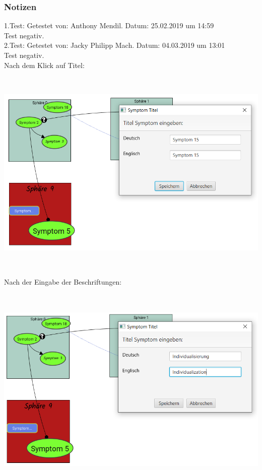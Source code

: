 \documentclass[enabledeprecatedfontcommands]{scrartcl}
\begin{document}
\subsubsection{Notizen}
1.Test: Getestet von: Anthony Mendil. Datum: 25.02.2019 um 14:59 \\
Test negativ. \\
2.Test: Getestet von: Jacky Philipp Mach. Datum: 04.03.2019 um 13:01 \\
Test negativ.\\
Nach dem Klick auf Titel: 
\begin{center}
\includegraphics[height=10cm]{3_44oeffnen.PNG}
\end{center}
Nach der Eingabe der Beschriftungen:
\begin{center}
\includegraphics[height=10cm]{3_44eingabe.PNG}
\end{center}
\end{document}
